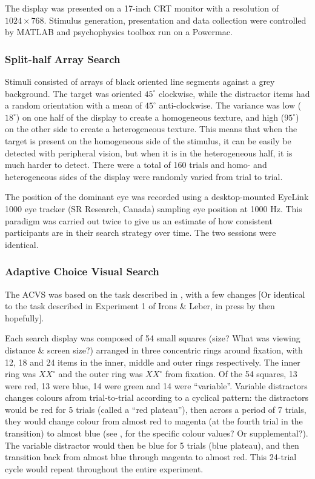 \documentclass[]{rsos}%
\begin{document}
The display was presented on a 17-inch CRT monitor with a resolution of $1024 \times 
768$. Stimulus generation, presentation and data collection were controlled by MATLAB and psychophysics toolbox \cite{brainard1997} run on a Powermac. 

\subsubsection{Split-half Array Search}

Stimuli consisted of arrays of black oriented line segments against a grey background. The target was oriented $45^{\circ}$ clockwise, while the distractor items had a random orientation with a mean of $45^{\circ}$ anti-clockwise. The variance was low ($18^{\circ}$) on one half of the display to create a homogeneous texture, and high ($95^{\circ}$) on the other side to create a heterogeneous texture. This means that when the target is present on the homogeneous side of the stimulus, it can be easily be detected with peripheral vision, but when it is in the heterogeneous half, it is much harder to detect. There were a total of 160 trials and homo- and heterogeneous sides of the display were randomly varied from trial to trial.
 
The position of the dominant eye was recorded using a desktop-mounted EyeLink 1000 eye
tracker (SR Research, Canada) sampling eye position at 1000 Hz.
This paradigm was carried out twice to give us an estimate of how consistent participants are in their search strategy over time. The two sessions were identical.

\subsubsection{Adaptive Choice Visual Search}

The ACVS was based on the task described in \cite{irons-leber2016}, with a few changes [Or identical to the task described in Experiment 1 of Irons \& Leber, in press by then hopefully].

Each search display was composed of 54 small squares (size? What was viewing distance \& screen size?) arranged in three concentric rings around fixation, with 12, 18 and 24 items in the inner, middle and outer rings respectively. The inner ring was $XX^{\circ}$ and the outer ring was $XX^{\circ}$ from fixation. Of the 54 squares, 13 were red, 13 were blue, 14 were green and 14 were “variable”. Variable distractors changes colours afrom trial-to-trial according to a cyclical pattern: the distractors would be red for 5 trials (called a “red plateau”), then across a period of 7 trials, they would change colour from almost red to magenta (at the fourth trial in the transition) to almost blue (see \cite{irons-leber2017}, for the specific colour values? Or supplemental?). The variable distractor would then be blue for 5 trials (blue plateau), and then transition back from almost blue through magenta to almost red. This 24-trial cycle would repeat throughout the entire experiment. 
\end{document}
